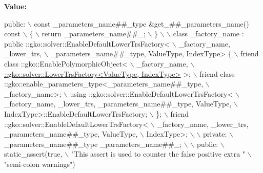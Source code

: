 {\bfseries Value\+:}
\begin{DoxyCode}
\textcolor{keyword}{public}:                                                                        \(\backslash\)
    const \_parameters\_name##\_type &get\_##\_parameters\_name() const              \(\backslash\)
    \{                                                                          \(\backslash\)
        return \_parameters\_name##\_;                                            \(\backslash\)
    \}                                                                          \(\backslash\)
                                                                               \(\backslash\)
    class \_factory\_name : public ::gko::solver::EnableDefaultLowerTrsFactory<  \(\backslash\)
                              \_factory\_name, \_lower\_trs,                       \(\backslash\)
                              \_parameters\_name##\_type, ValueType, IndexType> \{ \(\backslash\)
        friend class ::gko::EnablePolymorphicObject<                           \(\backslash\)
            \_factory\_name,                                                     \(\backslash\)
            \hyperlink{classgko_1_1AbstractFactory}{::gko::solver::LowerTrsFactory<ValueType, IndexType>}
      >;             \(\backslash\)
        friend class ::gko::enable\_parameters\_type<\_parameters\_name##\_type,    \(\backslash\)
                                                   \_factory\_name>;             \(\backslash\)
        using ::gko::solver::EnableDefaultLowerTrsFactory<                     \(\backslash\)
            \_factory\_name, \_lower\_trs, \_parameters\_name##\_type, ValueType,     \(\backslash\)
            IndexType>::EnableDefaultLowerTrsFactory;                          \(\backslash\)
    \};                                                                         \(\backslash\)
    friend ::gko::solver::EnableDefaultLowerTrsFactory<                        \(\backslash\)
        \_factory\_name, \_lower\_trs, \_parameters\_name##\_type, ValueType,         \(\backslash\)
        IndexType>;                                                            \(\backslash\)
                                                                               \(\backslash\)
private:                                                                       \(\backslash\)
    \_parameters\_name##\_type \_parameters\_name##\_;                               \(\backslash\)
                                                                               \(\backslash\)
public:                                                                        \(\backslash\)
    static\_assert(\textcolor{keyword}{true},                                                        \(\backslash\)
                  \textcolor{stringliteral}{"This assert is used to counter the false positive extra "}   \(\backslash\)
                  \textcolor{stringliteral}{"semi-colon warnings"})
\end{DoxyCode}


